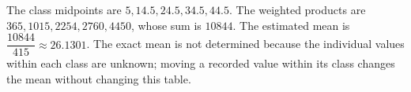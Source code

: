 The class midpoints are $ 5,14.5,24.5,34.5,44.5 $. The weighted products are $ 365,1015,2254,2760,4450 $, whose sum is $ 10844 $. The estimated mean is $\boxed{\dfrac{10844}{415}\approx26.1301}$. The exact mean is not determined because the individual values within each class are unknown; moving a recorded value within its class changes the mean without changing this table.

